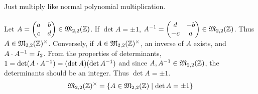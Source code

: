  Just multiply like normal polynomial multiplication.\\
\\
 Let $A = \begin{pmatrix}
a & b \\ c & d
\end{pmatrix} \in \mathfrak{M}_{2, 2}(\mathbb{Z})$. If $\det A = \pm 1$, $A^{-1} = \begin{pmatrix}
d & -b \\ -c & a
\end{pmatrix} \in \mathfrak{M}_{2, 2}(\mathbb{Z})$. Thus $A\in \mathfrak{M}_{2, 2}(\mathbb{Z})^\times$. Conversely, if $A\in \mathfrak{M}_{2, 2}(\mathbb{Z})^\times$, an inverse of $A$ exists, and $A\cdot A^{-1} = I_2$. From the properties of determinants, $1 = \det (A\cdot A^{-1}) = (\det A)(\det A^{-1})$ and since $A, A^{-1} \in \mathfrak{M}_{2, 2}(\mathbb{Z})$, the determinants should be an integer. Thus $\det A = \pm 1$.
$$\mathfrak{M}_{2, 2}(\mathbb{Z})^\times = \{A\in \mathfrak{M}_{2, 2}(\mathbb{Z}) \mid \det A = \pm 1\}$$

\pagebreak